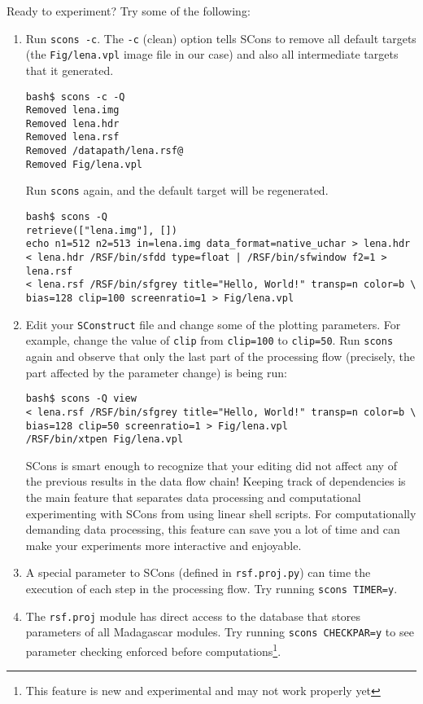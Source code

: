 Ready to experiment? Try some of the following:
\begin{enumerate}
\item Run \texttt{scons -c}. The \texttt{-c} (clean) option tells
  SCons to remove all default targets (the \texttt{Fig/lena.vpl} image
  file in our case) and also all intermediate targets that it generated. 
\begin{verbatim}
bash$ scons -c -Q
Removed lena.img
Removed lena.hdr
Removed lena.rsf
Removed /datapath/lena.rsf@
Removed Fig/lena.vpl
\end{verbatim}
Run \texttt{scons} again, and the default target will be regenerated.
\begin{verbatim}
bash$ scons -Q
retrieve(["lena.img"], [])
echo n1=512 n2=513 in=lena.img data_format=native_uchar > lena.hdr
< lena.hdr /RSF/bin/sfdd type=float | /RSF/bin/sfwindow f2=1 > lena.rsf
< lena.rsf /RSF/bin/sfgrey title="Hello, World!" transp=n color=b \
bias=128 clip=100 screenratio=1 > Fig/lena.vpl
\end{verbatim}
\item Edit your \texttt{SConstruct} file and change some of the
  plotting parameters. For example, change the value of \texttt{clip}
  from \texttt{clip=100} to \texttt{clip=50}. Run \texttt{scons} again
  and observe that only the last part of the processing flow
  (precisely, the part affected by the parameter change) is being run:
\begin{verbatim}
bash$ scons -Q view
< lena.rsf /RSF/bin/sfgrey title="Hello, World!" transp=n color=b \
bias=128 clip=50 screenratio=1 > Fig/lena.vpl
/RSF/bin/xtpen Fig/lena.vpl
\end{verbatim}
  SCons is smart enough to recognize that your editing did not affect
  any of the previous results in the data flow chain! Keeping track of
  dependencies is the main feature that separates data processing and
  computational experimenting with SCons from using linear shell
  scripts.  For computationally demanding data processing, this
  feature can save you a lot of time and can make your experiments
  more interactive and enjoyable.
\item A special parameter to SCons (defined in \texttt{rsf.proj.py})
  can time the execution of each step in the processing flow. Try
  running \texttt{scons TIMER=y}.
\item The \texttt{rsf.proj} module has direct access to the database
  that stores parameters of all Madagascar modules. Try running
  \texttt{scons CHECKPAR=y} to see parameter checking enforced before
  computations\footnote{This feature is new and experimental and may
    not work properly yet}.
\end{enumerate}

